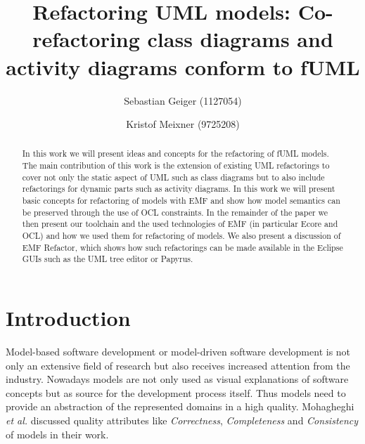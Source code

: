 \documentclass{llncs}
\begin{document}
\renewcommand{\thelstlisting}{\arabic{lstlisting}}
\pagestyle{plain}

\title{Refactoring UML models: Co-refactoring class diagrams and activity diagrams conform to fUML}


\author{Sebastian Geiger (1127054) \and Kristof Meixner (9725208)}
\maketitle

\begin{abstract}
In this work we will present ideas and concepts for the refactoring of fUML models. The main contribution of this work is 
the extension of existing UML refactorings to cover not only the static aspect of UML such as class diagrams but to also 
include refactorings for dynamic
parts such as activity diagrams. In this work we will present basic concepts for refactoring of models with EMF and show how model semantics can be
preserved through the use of OCL constraints. In the remainder of the paper we then present our toolchain and the used technologies
of EMF (in particular Ecore and OCL) and how we used them for refactoring of models. We also present a discussion of EMF Refactor, which shows how such refactorings
can be made available in the Eclipse GUIs such as the UML tree editor or Papyrus.
\end{abstract}

\tableofcontents
\newpage


\section{Introduction}

Model-based software development or model-driven software development is not only an extensive field of research but
also receives increased attention from the industry. Nowadays models are not only used as visual explanations of
software concepts but as source for the development process itself. Thus models need to provide an abstraction of
the represented domains in a high quality. Mohagheghi \textit{et al.} \cite{DBLP:journals/infsof/MohagheghiDN09} discussed 
quality attributes like \textit{Correctness}, \textit{Completeness} and \textit{Consistency} of models in their work.
\end{document}
